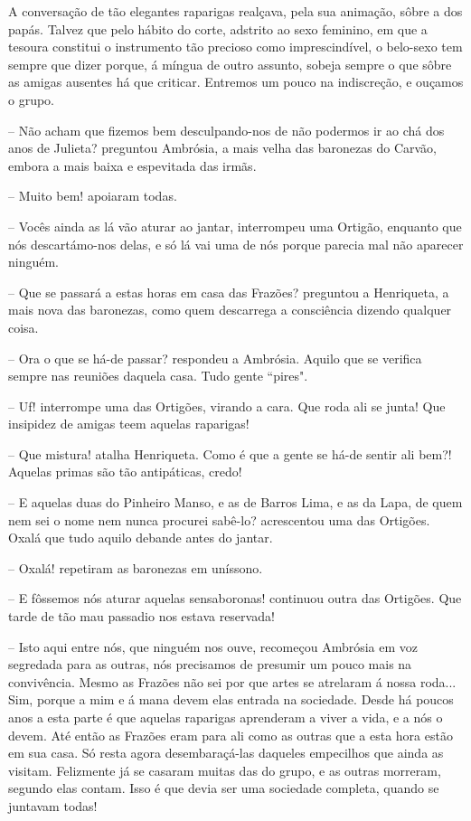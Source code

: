 \documentclass[9pt]{article}
\begin{document}
A conversa\-ção de tão elegantes raparigas realçava, pela sua anima\-ção, sôbre a dos papás. Talvez que pelo hábito do corte,  adstrito ao sexo feminino, em que a tesoura constitui o instrumento tão precioso como imprescindível, o belo-sexo tem sempre que dizer porque, á míngua de outro
assunto, sobeja sempre o que sôbre as amigas ausentes há que criticar.
Entremos um pouco na indiscre\-ção, e ouçamos o grupo.

-- Não acham que fizemos bem desculpando-nos de não podermos ir
ao chá dos anos de Julieta? preguntou Ambrósia, a mais ve\-lha das baronezas do Carvão, embora a mais baixa e espevitada das irmãs.

-- Muito bem! apoiaram todas.

-- Vocês ainda as lá vão aturar ao jantar, interrompeu uma Ortigão,
enquanto que nós descartámo-nos delas, e só lá vai uma de nós porque
parecia mal não aparecer nin\-guém.

-- Que se passará a estas horas em casa das Frazões? preguntou a
Henriqueta, a mais nova das baronezas, como quem descarrega a consciência
dizendo qualquer coisa.

-- Ora o que se há-de passar? respondeu a Ambrósia. Aquilo que se
verifi\-ca sempre nas reuniões daquela casa. Tudo gente ``pires".

-- Uf! interrompe uma das Ortigões, virando a cara. Que roda ali se
junta! Que insipidez de amigas teem aquelas raparigas!

-- Que mistura! ata\-lha Henriqueta. Como é que a gente se há-de sentir ali bem?! Aquelas primas são tão antipáticas, credo!

-- E aquelas duas do Pinheiro Manso, e as de Barros Lima, e as da Lapa,
de quem nem sei o nome nem nunca procurei sabê-lo? acrescentou uma das
Ortigões. Oxalá que tudo aquilo debande antes do jantar.

-- Oxalá! repetiram as baronezas em uníssono.

-- E fôssemos nós aturar aquelas sensaboronas! continuou outra das
Ortigões. Que tarde de tão mau passadio nos estava reservada!

-- Isto aqui entre nós, que nin\-guém nos ouve, recomeçou Ambrósia em
voz segredada para as outras, nós precisamos de presumir um pouco mais
na convivência. Mesmo as Frazões não sei por que artes se atrelaram á
nossa roda... Sim, porque a mim e á mana devem elas entrada na sociedade. Desde há poucos anos a esta parte é que aquelas raparigas aprenderam a viver a vida, e a nós o devem. Até então as Frazões eram para
ali como as outras que a esta hora estão em sua casa. Só resta agora
desembaraçá-las daqueles empeci\-lhos que ainda as visitam. Felizmente
já se casaram muitas das do grupo, e as outras morreram, segundo elas contam.
Isso é que devia ser uma sociedade completa, quan\-do se juntavam todas!
\end{document}
